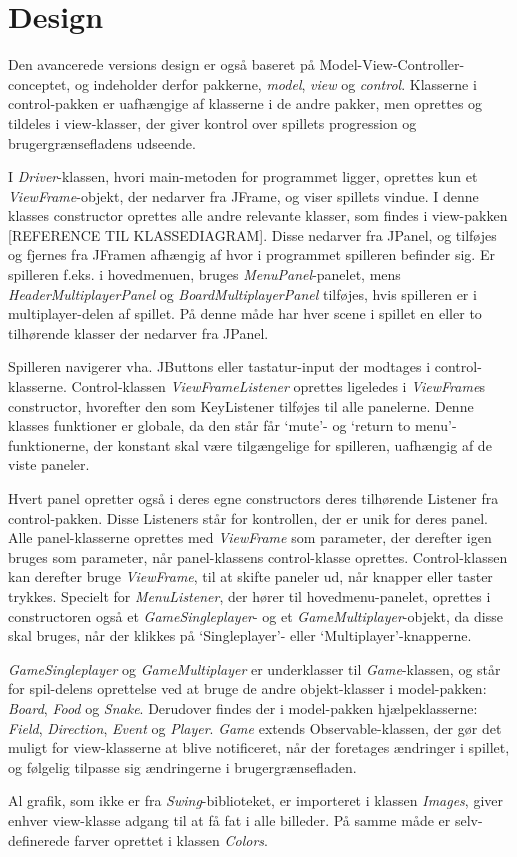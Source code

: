 \section{Design}
Den avancerede versions design er også baseret på Model-View-Controller-conceptet, og indeholder derfor pakkerne, \textit{model}, \textit{view} og \textit{control}. Klasserne i control-pakken er uafhængige af klasserne i de andre pakker, men oprettes og tildeles i view-klasser, der giver kontrol over spillets progression og brugergrænsefladens udseende.

I \textit{Driver}-klassen, hvori main-metoden for programmet ligger, oprettes kun et \textit{ViewFrame}-objekt, der nedarver fra JFrame, og viser spillets vindue. I denne klasses constructor oprettes alle andre relevante klasser, som findes i view-pakken [REFERENCE TIL KLASSEDIAGRAM]. Disse nedarver fra JPanel, og tilføjes og fjernes fra JFramen afhængig af hvor i programmet spilleren befinder sig. Er spilleren f.eks. i hovedmenuen, bruges \textit{MenuPanel}-panelet, mens \textit{HeaderMultiplayerPanel} og \textit{BoardMultiplayerPanel} tilføjes, hvis spilleren er i multiplayer-delen af spillet. På denne måde har hver scene i spillet en eller to tilhørende klasser der nedarver fra JPanel. 

Spilleren navigerer vha. JButtons eller tastatur-input der modtages i control-klasserne. Control-klassen \textit{ViewFrameListener} oprettes ligeledes i \textit{ViewFrame}s constructor, hvorefter den som KeyListener tilføjes til alle panelerne. Denne klasses funktioner er globale, da den står får `mute'- og `return to menu'-funktionerne, der konstant skal være tilgængelige for spilleren, uafhængig af de viste paneler.

Hvert panel opretter også i deres egne constructors deres tilhørende Listener fra control-pakken. Disse Listeners står for kontrollen, der er unik for deres panel. Alle panel-klasserne oprettes med \textit{ViewFrame} som parameter, der derefter igen bruges som parameter, når panel-klassens control-klasse oprettes. Control-klassen kan derefter bruge \textit{ViewFrame}, til at skifte paneler ud, når knapper eller taster trykkes. Specielt for \textit{MenuListener}, der hører til hovedmenu-panelet, oprettes i constructoren også et \textit{GameSingleplayer}- og et \textit{GameMultiplayer}-objekt, da disse skal bruges, når der klikkes på `Singleplayer'- eller `Multiplayer'-knapperne. 

\textit{GameSingleplayer} og \textit{GameMultiplayer} er underklasser til \textit{Game}-klassen, og står for spil-delens oprettelse ved at bruge de andre objekt-klasser i model-pakken: \textit{Board}, \textit{Food} og \textit{Snake}. Derudover findes der i model-pakken hjælpeklasserne: \textit{Field}, \textit{Direction}, \textit{Event} og \textit{Player}. \textit{Game} extends Observable-klassen, der gør det muligt for view-klasserne at blive notificeret, når der foretages ændringer i spillet, og følgelig tilpasse sig ændringerne i brugergrænsefladen.

Al grafik, som ikke er fra \textit{Swing}-biblioteket, er importeret i klassen \textit{Images}, giver enhver view-klasse adgang til at få fat i alle billeder. På samme måde er selv-definerede farver oprettet i klassen \textit{Colors}.